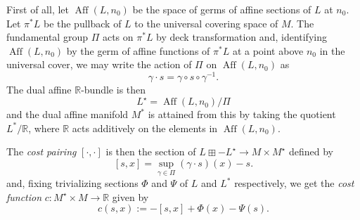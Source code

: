 \documentclass{article}
\newcommand{\RR}{\mathbb{R}}
\newcommand{\op}[1]{\operatorname{#1}}
\begin{document}
First of all, let $\op{Aff}(L,n_0)$ be the space of germs of affine sections of $L$ at $n_0$. Let $\pi^* L$ be the pullback of $L$ to the universal covering space of $M$. The fundamental group $\Pi$ acts on $\pi^* L$ by deck transformation and, identifying $\op{Aff}(L,n_0)$ by the germ of affine functions of $\pi^*L$ at a point above $n_0$ in the universal cover, we may write the action of $\Pi$ on $\op{Aff}(L,n_0)$ as
$$ \gamma \cdot s = \gamma \circ s \circ \gamma^{-1}. $$
The dual affine $\mathbb R$-bundle is then 
$$ L^\star= \op{Aff}(L,n_0)/\Pi $$
and the dual affine manifold $M^*$ is attained from this by taking the quotient $L^*/\mathbb R$, where $\mathbb R$ acts additively on the elements in $\op{Aff}(L,n_0)$. 

The \emph{cost pairing} $[\cdot,\cdot]$ is then the section of  $L\boxplus-L^\star \to M\times M^\star$ defined by
\[
[s,x] = \sup_{\gamma \in \Pi}(\gamma \cdot s)(x) - s.
\]
and, fixing trivializing sections $\Phi$ and $\Psi$ of $L$ and $L^*$ respectively, we get the \emph{cost function} $c:M^\star\times M \to \RR$ given by
$$ c(s,x) := -[s,x]+\Phi(x)-\Psi(s). $$
\end{document}
